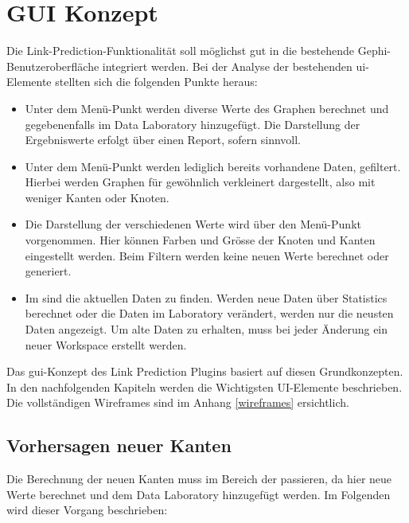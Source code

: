 \section{GUI Konzept}

Die Link-Prediction-Funktionalität soll möglichst gut in die bestehende Gephi-Benutzeroberfläche integriert werden.
Bei der Analyse der bestehenden \acs{ui}-Elemente stellten sich die folgenden Punkte heraus:

\begin{itemize}
    \item Unter dem Menü-Punkt  werden diverse Werte des Graphen berechnet und gegebenenfalls im Data Laboratory
          hinzugefügt. Die Darstellung der Ergebniswerte erfolgt über einen Report, sofern sinnvoll.
    \item Unter dem Menü-Punkt  werden lediglich bereits vorhandene Daten, gefiltert. Hierbei werden Graphen für gewöhnlich verkleinert dargestellt, also mit weniger Kanten oder Knoten.
    \item Die Darstellung der verschiedenen Werte wird über den Menü-Punkt  vorgenommen. Hier können Farben
          und Grösse der Knoten und Kanten eingestellt werden. Beim Filtern werden keine neuen Werte berechnet oder generiert.
    \item Im  sind die aktuellen Daten zu finden. Werden neue Daten über Statistics berechnet
          oder die Daten im Laboratory verändert, werden nur die neusten Daten angezeigt. Um alte Daten zu erhalten,
          muss bei jeder Änderung ein neuer Workspace erstellt werden.
\end{itemize}

Das \acs{gui}-Konzept des Link Prediction Plugins basiert auf diesen Grundkonzepten. In den nachfolgenden Kapiteln werden die Wichtigsten UI-Elemente beschrieben.
Die vollständigen Wireframes sind im Anhang \ref{wireframes} ersichtlich.

\subsection{Vorhersagen neuer Kanten}

Die Berechnung der neuen Kanten muss im Bereich der  passieren, da hier neue Werte berechnet und dem
Data Laboratory hinzugefügt werden. Im Folgenden wird dieser Vorgang beschrieben:

